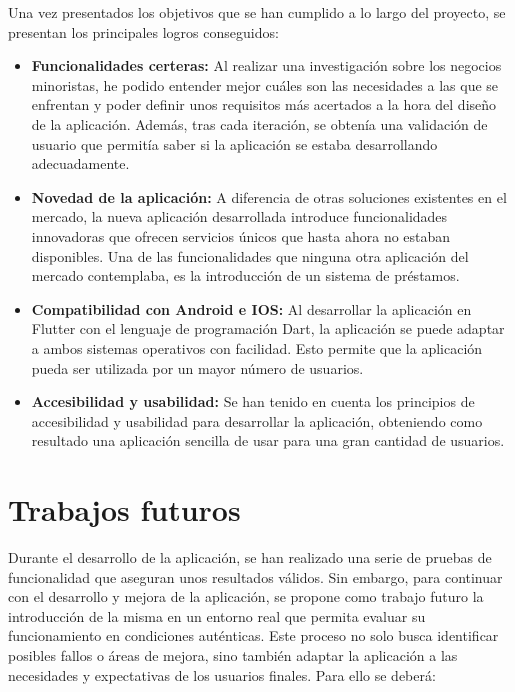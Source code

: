 Una vez presentados los objetivos que se han cumplido a lo largo del proyecto, se presentan los principales logros conseguidos: 

\begin{itemize}
	\item \textbf{Funcionalidades certeras: } Al realizar una investigación sobre los negocios minoristas, he podido entender mejor cuáles son las necesidades a las que se enfrentan y poder definir unos requisitos más acertados a la hora del diseño de la aplicación. Además, tras cada iteración, se obtenía una validación de usuario que permitía saber si la aplicación se estaba desarrollando adecuadamente. 
	\item \textbf{Novedad de la aplicación: } A diferencia de otras soluciones existentes en el mercado, la nueva aplicación desarrollada introduce funcionalidades innovadoras que ofrecen servicios únicos que hasta ahora no estaban disponibles. Una de las funcionalidades que ninguna otra aplicación del mercado contemplaba, es la introducción de un sistema de préstamos. 
	\item \textbf{Compatibilidad con Android e IOS: } Al desarrollar la aplicación en Flutter con el lenguaje de programación Dart, la aplicación se puede adaptar a ambos sistemas operativos con facilidad. Esto permite que la aplicación pueda ser utilizada por un mayor número de usuarios.  
	\item \textbf{Accesibilidad y usabilidad: } Se han tenido en cuenta los principios de accesibilidad y usabilidad para desarrollar la aplicación, obteniendo como resultado una aplicación sencilla de usar para una gran cantidad de usuarios. 
\end{itemize}

\section{Trabajos futuros}

Durante el desarrollo de la aplicación, se han realizado una serie de pruebas de funcionalidad que aseguran unos resultados válidos. Sin embargo, para continuar con el desarrollo y mejora de la aplicación, se propone como trabajo futuro la introducción de la misma en un entorno real que permita evaluar su funcionamiento en condiciones auténticas. Este proceso no solo busca identificar posibles fallos o áreas de mejora, sino también adaptar la aplicación a las necesidades y expectativas de los usuarios finales. Para ello se deberá: 

